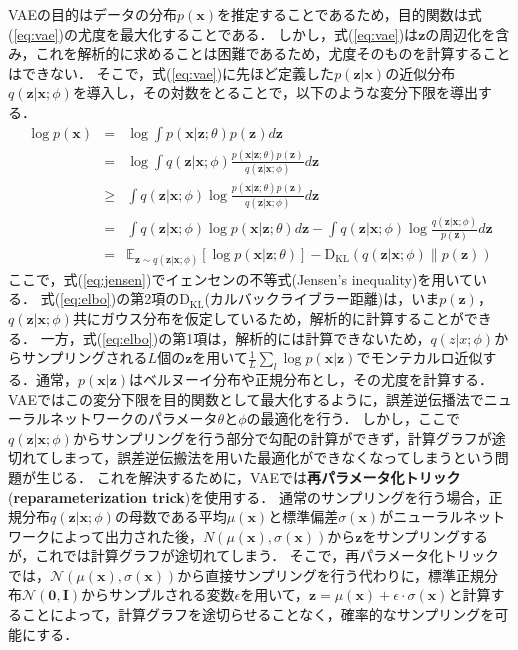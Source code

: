 VAEの目的はデータの分布$p(\bm{x})$を推定することであるため，目的関数は式(\ref{eq:vae})の尤度を最大化することである．
しかし，式(\ref{eq:vae})は$\bm{z}$の周辺化を含み，これを解析的に求めることは困難であるため，尤度そのものを計算することはできない．
そこで，式(\ref{eq:vae})に先ほど定義した$p(\bm{z}|\bm{x})$の近似分布$q(\bm{z}|\bm{x};\phi)$を導入し，その対数をとることで，以下のような変分下限を導出する．
\begin{eqnarray}
\log p(\bm{x}) &=& \log \int p(\bm{x}|\bm{z}; \theta) p(\bm{z}) d\bm{z} \nonumber \\
&=& \log \int q(\bm{z}|\bm{x}; \phi) \frac{p(\bm{x}|\bm{z}; \theta) p(\bm{z})}{q(\bm{z}|\bm{x}; \phi)} d\bm{z} \nonumber \\
&\geq& \int q(\bm{z}|\bm{x}; \phi) \log \frac{p(\bm{x}|\bm{z}; \theta) p(\bm{z})}{q(\bm{z}|\bm{x}; \phi)} d\bm{z} \label{eq:jensen}\\
&=& \int q(\bm{z}|\bm{x}; \phi) \log p(\bm{x}|\bm{z}; \theta) d\bm{z} - \int q(\bm{z}|\bm{x}; \phi) \log \frac{q(\bm{z}|\bm{x}; \phi)}{p(\bm{z})} d\bm{z} \nonumber \\
&=& \mathbb{E}_{\bm{z} \sim q(\bm{z}|\bm{x}; \phi)} [\log p(\bm{x}|\bm{z}; \theta)] - \mathrm{D_{KL}}(q(\bm{z}|\bm{x}; \phi) \| p(\bm{z})) \label{eq:elbo}
\end{eqnarray}
ここで，式(\ref{eq:jensen})でイェンセンの不等式(Jensen's inequality)を用いている．
式(\ref{eq:elbo})の第2項の$\mathrm{D_{KL}}$(カルバックライブラー距離)は，いま$p(\bm{z})$，$q(\bm{z}|\bm{x}; \phi)$共にガウス分布を仮定しているため，解析的に計算することができる．
一方，式(\ref{eq:elbo})の第1項は，解析的には計算できないため，$q(z|x; \phi)$からサンプリングされる$L$個の$\bm{z}$を用いて$\frac{1}{L} \sum_{l} \log p(\bm{x}|\bm{z})$でモンテカルロ近似する．通常，$p(\bm{x}|\bm{z})$はベルヌーイ分布や正規分布とし，その尤度を計算する．
VAEではこの変分下限を目的関数として最大化するように，誤差逆伝播法でニューラルネットワークのパラメータ$\theta$と$\phi$の最適化を行う．
しかし，ここで$q(\bm{z}|\bm{x}; \phi)$からサンプリングを行う部分で勾配の計算ができず，計算グラフが途切れてしまって，誤差逆伝搬法を用いた最適化ができなくなってしまうという問題が生じる．
これを解決するために，VAEでは{\bf 再パラメータ化トリック}({\bf reparameterization trick})を使用する．
通常のサンプリングを行う場合，正規分布$q(\bm{z}|\bm{x}; \phi)$の母数である平均$\mu (\bm{x})$と標準偏差$\sigma (\bm{x})$がニューラルネットワークによって出力された後，$N(\mu (\bm{x}), \sigma (\bm{x}))$から$\bm{z}$をサンプリングするが，これでは計算グラフが途切れてしまう．
そこで，再パラメータ化トリックでは，$\mathcal{N}(\mu (\bm{x}), \sigma (\bm{x}))$から直接サンプリングを行う代わりに，標準正規分布$\mathcal{N}(\bm{0},\bm{I})$からサンプルされる変数$\epsilon$を用いて，$\bm{z}=\mu (\bm{x})+ \epsilon \cdot \sigma (\bm{x})$と計算することによって，計算グラフを途切らせることなく，確率的なサンプリングを可能にする．

